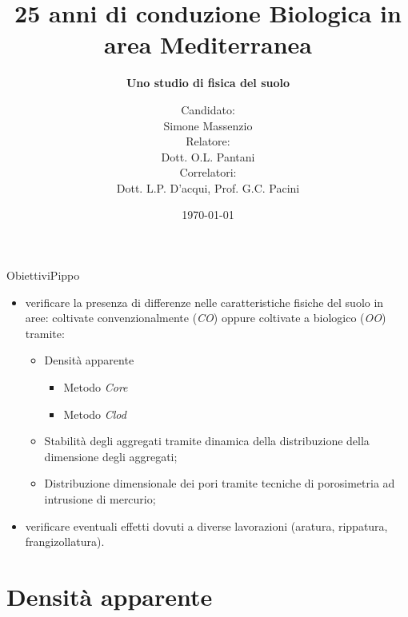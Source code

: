 \documentclass[10pt]{beamer}
\title[] %
{ %
  \textbf{25 anni di conduzione Biologica in
    area Mediterranea}
}
\subtitle[Uno studio di fisica del suolo]
{
  \textbf{Uno studio di fisica del suolo}
}
\author[Simone Massenzio]
{ 
  Candidato: \\Simone Massenzio \\
  Relatore: \\Dott. O.L. Pantani\\
  \vspace{0.1cm}
  Correlatori:\\
  Dott. L.P. D'acqui, Prof. G.C. Pacini}
\institute[] { \emph{Dipartimento di Scienze della Produzioni Animali e
    dell'Ambiente\\
    Universit\`a degli studi di Firenze - UniFI\\}
  
}
\date{\today}
\begin{document}
{\1
  \begin{frame}[noframenumbering]%
    \titlepage
  \end{frame}}






\begin{frame}{Obiettivi}{Pippo}
  \large
  \begin{itemize}[<+->]
  \item verificare la presenza di differenze nelle caratteristiche
    fisiche del suolo in aree: coltivate convenzionalmente (\emph{CO})
    oppure coltivate a biologico (\emph{OO}) tramite:
    \begin{itemize}
    \item Densit\`a apparente
      \begin{itemize}
      \item Metodo \emph{Core}
      \item Metodo \emph{Clod}
      \end{itemize}
    \item Stabilit\`a degli aggregati tramite dinamica della
      distribuzione della dimensione degli aggregati;
    \item Distribuzione dimensionale dei pori tramite tecniche di
      porosimetria ad intrusione di mercurio;      
    \end{itemize}
  \item verificare eventuali effetti dovuti a diverse lavorazioni
    (aratura, rippatura, frangizollatura).
  \end{itemize}
\end{frame}

\section{Densit\`a apparente}
\end{document}
